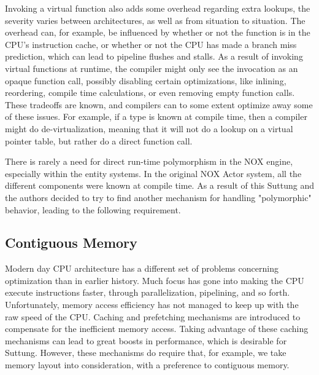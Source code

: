 Invoking a virtual function also adds some overhead regarding extra lookups, the severity varies between architectures,
as well as from situation to situation.
The overhead can, for example, be influenced by whether or not the function is in the CPU's instruction cache, or whether or not the CPU has made a branch miss prediction, which can lead to pipeline flushes and stalls\cite{scott_meyers_cpu_caches_and_why_you_care}\cite[Data Locality]{game_programming_patterns}.
As a result of invoking virtual functions at runtime, the compiler might only see the invocation as an opaque function call,
possibly disabling certain optimizations, like inlining, reordering, compile time calculations, or even removing empty function calls. 
These tradeoffs are known, and compilers can to some extent optimize away some of these issues.
For example, if a type is known at compile time, then a compiler might do de-virtualization,
meaning that it will not do a lookup on a virtual pointer table, but rather do a direct function call\cite{lazarenko_devirtualization}.

There is rarely a need for direct run-time polymorphism in the NOX engine, especially within the entity systems.
In the original NOX Actor system, all the different components were known at compile time.
As a result of this Suttung and the authors decided to try to find another mechanism for handling "polymorphic" behavior, leading to the following requirement.


\subsection{Contiguous Memory}
\label{subsec:requirements_performance_contiguous_memory}
Modern day CPU architecture has a different set of problems concerning optimization than in earlier history.
Much focus has gone into making the CPU execute instructions faster, through parallelization, pipelining, and so forth.
Unfortunately, memory access efficiency has not managed to keep up with the raw speed of the CPU.
Caching and prefetching mechanisms are introduced to compensate for the inefficient memory access\cite[p. 153]{game_engine_architecture}.
Taking advantage of these caching mechanisms can lead to great boosts in performance, which is desirable for Suttung.
However, these mechanisms do require that, for example, we take memory layout into consideration, with a preference
to contiguous memory.

